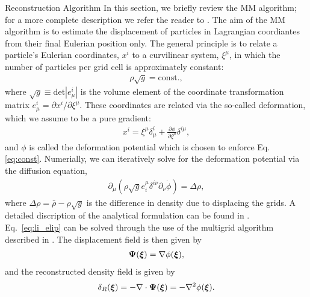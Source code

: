 \begin{section}{Reconstruction Algorithm}
  \label{sec:reconstruction}
  In this section, we briefly review the MM algorithm; for a more
  complete description we refer the reader to \cite{bib:ZhuH2016}.  
  The aim of the MM algorithm is to estimate the displacement of particles in 
  Lagrangian coordiantes from their final Eulerian position only. The
  general principle is to relate a particle's Eulerian coordinates, $x^i$ to
  a curvilinear system, $\xi^\mu$, in which the number of particles
  per grid cell is approximately constant:
  \begin{align}
   \label{eq:const}
    \rho \sqrt{g}=\mathrm{const.},
  \end{align}
  where $\sqrt{g} \equiv \mathrm{det}\left| e^i_\mu\right|$ is the volume
  element of the coordinate transformation matrix $e^i_\mu = \partial x^i / \partial \xi ^ \mu$. 
  These coordinates are
  related via the so-called deformation, which we assume to be a pure
  gradient:
  \begin{align}
    x^i = \xi^\mu \delta^i_\mu + \frac{\partial \phi}{\partial
    \xi^\mu}\delta^{i\mu},
  \end{align}
  and $\phi$ is called the deformation potential which is chosen to enforce Eq. \ref{eq:const}.  
  Numerially, we can iteratively solve for
  the deformation potential via the diffusion equation, 
  \begin{align}
    \label{eq:li_elip}
    \partial _\mu (\rho \sqrt{g} e^\mu _i \delta^{i\nu}
    \partial_\nu \dot{\phi})=\Delta \rho,
  \end{align}
  where $\Delta \rho = \bar{\rho}-\rho \sqrt{g}$ is the difference in density 
  due to displacing the grids. A detailed discription 
  of the analytical formulation can be found in \cite{bib:Pen1995,bib:Pen1998}.
  Eq.~\ref{eq:li_elip} can be solved through the use of the multigrid
  algorithm described in \cite{bib:Pen1995,bib:Pen1998,bib:ZhuH2016}.
  The displacement field is then given by
  \begin{align}
   \label{eq:disp}
   \boldsymbol{\Psi}(\boldsymbol{\xi})=\nabla \phi(\boldsymbol{\xi}),
  \end{align}
  and the reconstructed density field is given by
  \begin{align}
   \label{eq:delta}
   \delta_R(\boldsymbol{\xi})=- \nabla \cdot \boldsymbol{\Psi}(\boldsymbol{\xi}) = - \nabla^2 \phi(\boldsymbol{\xi}). 
  \end{align}

\end{section}

